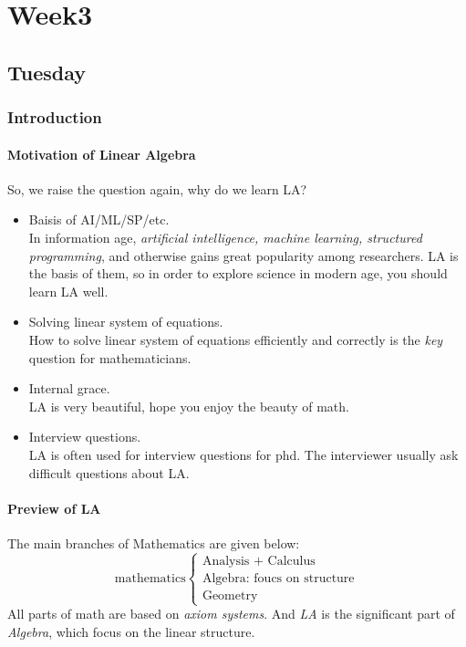 
\chapter{Week3}

\section{Tuesday}
\subsection{Introduction}
\subsubsection{Motivation of Linear Algebra}
So, we raise the question again, why do we learn LA?
\begin{itemize}
\item
Baisis of AI/ML/SP/etc.\\
In information age, \textit{artificial intelligence, machine learning, structured programming}, and otherwise gains great popularity among researchers. LA is the basis of them, so in order to explore science in modern age, you should learn LA well.
\item
Solving linear system of equations.\\
How to solve linear system of equations efficiently and correctly is the \emph{key} question for mathematicians.
\item
Internal grace.\\
LA is very beautiful, hope you enjoy the beauty of math.
\item
Interview questions.\\
LA is often used for interview questions for phd. The interviewer usually ask difficult questions about LA.
\end{itemize}
\subsubsection{Preview of LA}
The main branches of Mathematics are given below:
\[
\text{mathematics}\begin{cases}
\mbox{Analysis + Calculus} \\
\mbox{Algebra: foucs on structure} \\
\mbox{Geometry}
\end{cases}
\]
All parts of math are based on \emph{axiom systems}. And \emph{LA} is the significant part of \textit{Algebra}, which focus on the linear structure.

